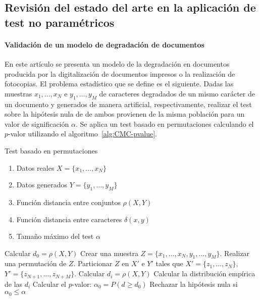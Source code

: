 \subsection{Revisión del estado del arte en la aplicación de test no paramétricos}
 
\paragraph{Validación de un modelo de degradación de documentos} \cite{KANUNGO00} En este artículo se presenta un modelo de la degradación en documentos producida por la digitalización de documentos impresos o la realización de fotocopias. El problema estadístico que se define es el siguiente. Dadas las muestras $x_1, \dots, x_N$ e $y_1, \dots, y_M$ de caracteres degradados de un mismo carácter de un documento y generados de manera artificial, respectivamente, realizar el test sobre la hipótesis nula de de ambos  provienen de la misma población para un valor de significación $\alpha$. Se aplica un test basado en permutaciones calculando el $p$-valor utilizando el algoritmo~\ref{alg:CMC-pvalue}.

\begin{algorithm}
	\caption{Test basado en permutaciones}
	\begin{algorithmic}[1]
	\REQUIRE
		\begin{enumerate}[a]
		\item Datos reales $X = \{ x_1, \dots, x_N \}$
		\item Datos generados $Y = \{ y_1, \dots, y_M \}$
		\item Función distancia entre conjuntos $\rho(X,Y)$
		\item Función distancia entre caracteres $\delta(x,y)$
		\item Tamaño máximo del test $\alpha$
		\end{enumerate}
		\STATE Calcular $d_0 = \rho(X,Y)$
		\STATE Crear una muestra $Z= \{x_1, \dots, x_N, y_1, \dots, y_M \}$.
			\STATE Realizar una permutación de $Z$.
			\STATE Particionar $Z$ en $X'$ e $Y'$ tales que $X' = \{ z_1, \dots, z_N \}$, $Y' = \{ z_{N+1}, \dots, z_{N+M} \} $.
			\STATE Calcular $d_i = \rho(X,Y)$
		\ENDFOR
		\STATE Calcular la distribución empírica de las $d_i$
		\STATE Calcular el $p$-valor: $\alpha_0 = P(d \geq d_0)$
		\STATE Rechazar la hipótesis nula si $\alpha_0 \leq \alpha$
	\end{algorithmic}
\end{algorithm}

